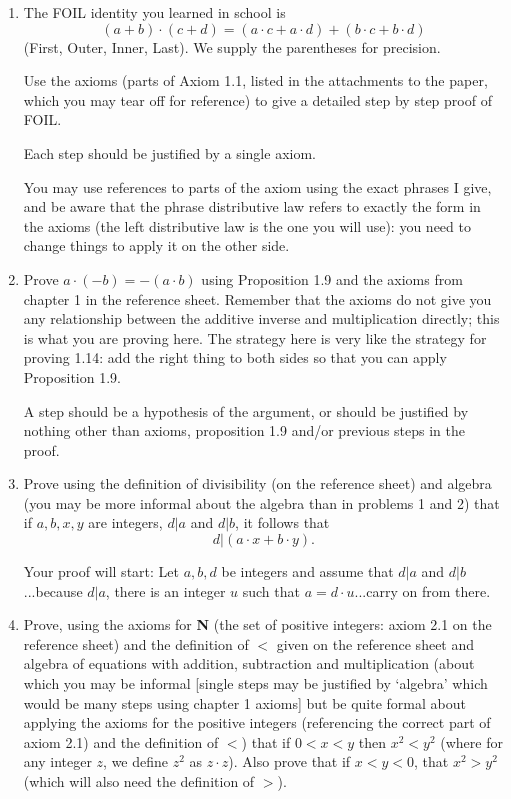 \documentclass[12pt]{article}
\begin{document}
\begin{enumerate}

\item The FOIL identity you learned in school is $$(a+b)\cdot(c+d) = (a\cdot c + a \cdot d) + (b \cdot c + b \cdot d)$$ (First, Outer, Inner, Last).  We supply the parentheses for precision.  

Use the axioms (parts of Axiom 1.1, listed in the attachments to the paper, which you may tear off for reference) to give a detailed step by step proof of FOIL.  

Each step should be justified by a single axiom.  

You may use references to parts of the axiom using the exact phrases I give, and be aware that the phrase distributive law refers to exactly the form in the axioms (the left distributive law is the one you will use):  you need to change things to apply it on the other side.

\newpage

\item  Prove $a \cdot (-b) = -(a\cdot b)$ using Proposition 1.9 and the axioms from chapter 1 in the reference sheet.  Remember that the axioms do not give you any relationship between the additive inverse and multiplication directly;  this is what you are proving here.  The strategy here is very like the strategy for proving 1.14: add the right thing to both sides so that you can apply Proposition 1.9.

A step should be a hypothesis of the argument, or should be justified by nothing other than axioms, proposition 1.9 and/or previous steps in the proof.

\newpage

\item Prove using the definition of divisibility (on the reference sheet) and algebra (you may be more informal about the algebra than in problems 1 and  2) that if $a,b,x,y$ are integers, $d|a$ and $d|b$, it follows that $$d|(a\cdot x+b\cdot y).$$

Your proof will start:  Let $a,b,d$ be integers and assume that $d|a$ and $d|b$...because $d|a$, there is an integer $u$ such that $a=d\cdot u$...carry on from there.

\newpage

\item Prove, using the axioms for {\bf N} (the set of positive integers:  axiom 2.1 on the reference sheet) and the definition of $<$ given on the reference sheet and algebra of equations with addition, subtraction and multiplication (about which you may be informal [single steps may be justified by `algebra' which would be many steps using chapter 1 axioms] but be quite formal about applying the axioms for the positive integers (referencing the correct part of axiom 2.1) and the definition of $<$) that if $0<x<y$ then $x^2 < y^2$ (where for any integer $z$, we define
$z^2$ as $z \cdot z$).  Also prove that if $x<y<0$, that $x^2 > y^2$ (which will also need the definition of $>$).


\end{enumerate}
\end{document}
